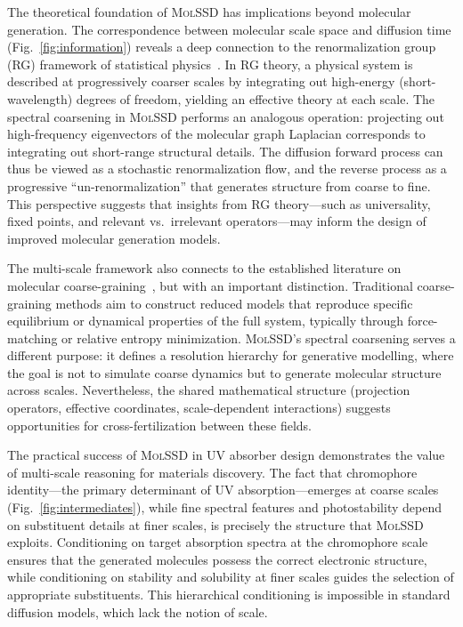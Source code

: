\documentclass[11pt]{article}
\newcommand{\molssd}{\textsc{MolSSD}}
\begin{document}
The theoretical foundation of \molssd{} has implications beyond molecular generation. The correspondence between molecular scale space and diffusion time (Fig.~\ref{fig:information}) reveals a deep connection to the renormalization group (RG) framework of statistical physics~\cite{wilson1983renormalization, kadanoff1966scaling}. In RG theory, a physical system is described at progressively coarser scales by integrating out high-energy (short-wavelength) degrees of freedom, yielding an effective theory at each scale. The spectral coarsening in \molssd{} performs an analogous operation: projecting out high-frequency eigenvectors of the molecular graph Laplacian corresponds to integrating out short-range structural details. The diffusion forward process can thus be viewed as a stochastic renormalization flow, and the reverse process as a progressive ``un-renormalization'' that generates structure from coarse to fine. This perspective suggests that insights from RG theory---such as universality, fixed points, and relevant vs.\ irrelevant operators---may inform the design of improved molecular generation models.

The multi-scale framework also connects to the established literature on molecular coarse-graining~\cite{noid2008cg, kmiecik2016cg}, but with an important distinction. Traditional coarse-graining methods aim to construct reduced models that reproduce specific equilibrium or dynamical properties of the full system, typically through force-matching or relative entropy minimization. \molssd{}'s spectral coarsening serves a different purpose: it defines a resolution hierarchy for generative modelling, where the goal is not to simulate coarse dynamics but to generate molecular structure across scales. Nevertheless, the shared mathematical structure (projection operators, effective coordinates, scale-dependent interactions) suggests opportunities for cross-fertilization between these fields.

The practical success of \molssd{} in UV absorber design demonstrates the value of multi-scale reasoning for materials discovery. The fact that chromophore identity---the primary determinant of UV absorption---emerges at coarse scales (Fig.~\ref{fig:intermediates}), while fine spectral features and photostability depend on substituent details at finer scales, is precisely the structure that \molssd{} exploits. Conditioning on target absorption spectra at the chromophore scale ensures that the generated molecules possess the correct electronic structure, while conditioning on stability and solubility at finer scales guides the selection of appropriate substituents. This hierarchical conditioning is impossible in standard diffusion models, which lack the notion of scale.
\end{document}
